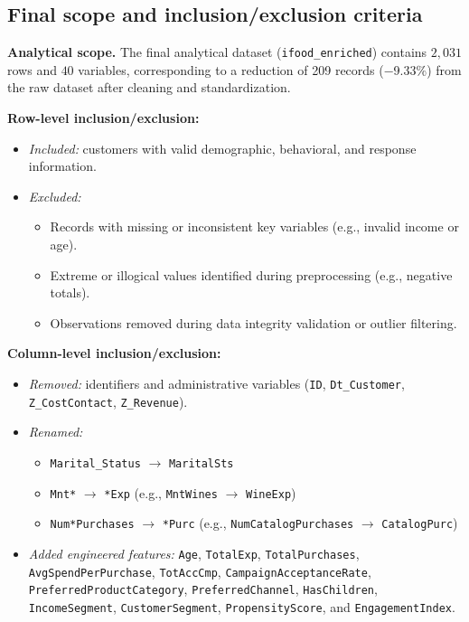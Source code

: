 \vspace{0.5em}

\subsection{Final scope and inclusion/exclusion criteria}

\textbf{Analytical scope.}
The final analytical dataset (\texttt{ifood\_enriched}) contains \(2{,}031\) rows and \(40\)
variables, corresponding to a reduction of 209 records (−9.33\%) from the raw
dataset after cleaning and standardization.

\textbf{Row-level inclusion/exclusion:}
\begin{itemize}
    \item \textit{Included:} customers with valid demographic, behavioral, and response information.
    \item \textit{Excluded:}
    \begin{itemize}
        \item Records with missing or inconsistent key variables (e.g., invalid income or age).
        \item Extreme or illogical values identified during preprocessing (e.g., negative totals).
        \item Observations removed during data integrity validation or outlier filtering.
    \end{itemize}
\end{itemize}

\textbf{Column-level inclusion/exclusion:}
\begin{itemize}
    \item \textit{Removed:} identifiers and administrative variables (\texttt{ID}, \texttt{Dt\_Customer},
    \texttt{Z\_CostContact}, \texttt{Z\_Revenue}).
    \item \textit{Renamed:}
    \begin{itemize}
        \item \texttt{Marital\_Status} $\rightarrow$ \texttt{MaritalSts}
        \item \texttt{Mnt*} $\rightarrow$ \texttt{*Exp} (e.g., \texttt{MntWines} $\rightarrow$ \texttt{WineExp})
        \item \texttt{Num*Purchases} $\rightarrow$ \texttt{*Purc} (e.g., \texttt{NumCatalogPurchases} $\rightarrow$ \texttt{CatalogPurc})
    \end{itemize}
    \item \textit{Added engineered features:} \texttt{Age}, \texttt{TotalExp}, \texttt{TotalPurchases},
    \texttt{AvgSpendPerPurchase}, \texttt{TotAccCmp}, \texttt{CampaignAcceptanceRate},
    \texttt{PreferredProductCategory}, \texttt{PreferredChannel}, \texttt{HasChildren},
    \texttt{IncomeSegment}, \texttt{CustomerSegment}, \texttt{PropensityScore}, and \texttt{EngagementIndex}.
\end{itemize}

